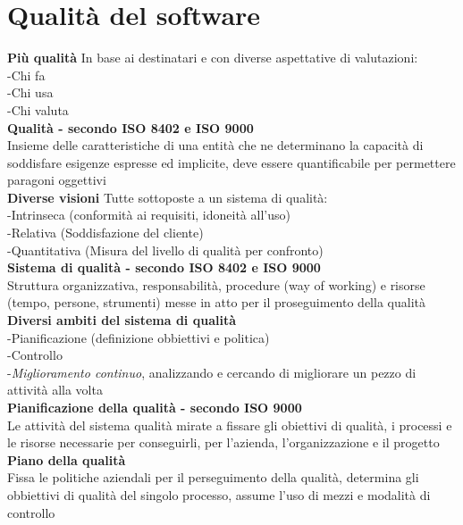 \documentclass{article}
\begin{document}
		\clearpage
		\section{Qualità del software}
		
		\textbf{Più qualità}
		In base ai destinatari e con diverse aspettative di valutazioni:\\
		-Chi fa\\
		-Chi usa\\
		-Chi valuta\\
		
		\textbf{Qualità - secondo ISO 8402 e ISO 9000}\\
		Insieme delle caratteristiche di una entità che ne determinano la capacità di soddisfare esigenze espresse ed implicite, deve essere quantificabile per permettere paragoni oggettivi\\
		
		\textbf{Diverse visioni}
		Tutte sottoposte a un sistema di qualità:\\
		-Intrinseca (conformità ai requisiti, idoneità all'uso)\\
		-Relativa (Soddisfazione del cliente)\\
		-Quantitativa (Misura del livello di qualità per confronto)\\
		
		\textbf{Sistema di qualità - secondo ISO 8402 e ISO 9000}\\
		Struttura organizzativa, responsabilità, procedure (way of working) e risorse (tempo, persone, strumenti) messe in atto per il proseguimento della qualità\\
		
		\textbf{Diversi ambiti del sistema di qualità}\\
		-Pianificazione (definizione obbiettivi e politica)\\
		-Controllo\\
		-\textit{Miglioramento continuo}, analizzando e cercando di migliorare un pezzo di attività alla volta\\
		
		\textbf{Pianificazione della qualità - secondo ISO 9000}\\
		Le attività del sistema qualità mirate a fissare gli obiettivi di qualità, i processi e le risorse necessarie per conseguirli, per l'azienda, l'organizzazione e il progetto\\
		
		\textbf{Piano della qualità}\\
		Fissa le politiche aziendali per il perseguimento della qualità, determina gli obbiettivi di qualità del singolo processo, assume l'uso di mezzi e modalità di controllo\\
		
\end{document}
